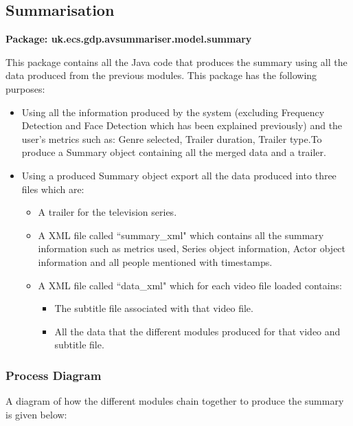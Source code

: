 \newpage

\subsection{Summarisation}
\label{sec:Summarisation}

\textbf{Package: uk.ecs.gdp.avsummariser.model.summary}

This package contains all the Java code that produces the summary using all the data produced from the previous modules. This package has the following purposes:
\begin{itemize}
	\item{Using all the information produced by the system (excluding Frequency Detection and Face Detection which has been explained previously) and the user's metrics such as: Genre selected, Trailer duration, Trailer type.To produce a Summary object containing all the merged data and a trailer.}
	\item{Using a produced Summary object export all the data produced into three files which are:}
	\begin{itemize}
		\item{A trailer for the television series.}
		\item{A XML file called ``summary\_xml" which contains all the summary information such as metrics used, Series object information, Actor object information and all people mentioned with timestamps.}
		\item{A XML file called ``data\_xml" which for each video file loaded contains:}
		\begin{itemize}
			\item{The subtitle file associated with that video file.}
			\item{All the data that the different modules produced for that video and subtitle file.}
		\end{itemize}
	\end{itemize}
\end{itemize}

\subsubsection{Process Diagram}
A diagram of how the different modules chain together to produce the summary is given below:

